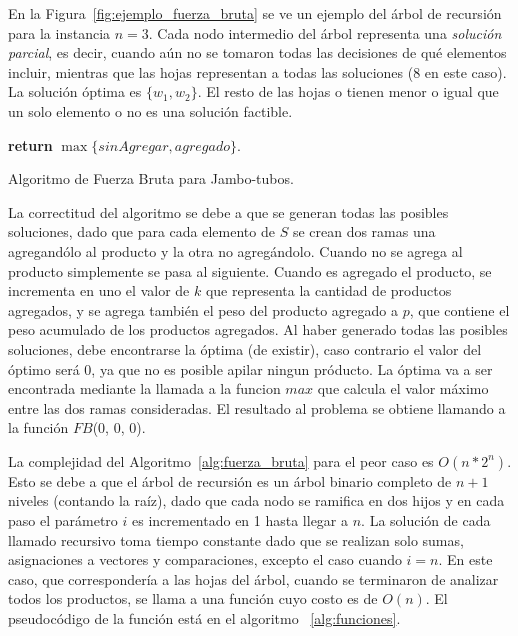 \documentclass[10pt,a4paper]{article}
\begin{document}
En la Figura~\ref{fig:ejemplo_fuerza_bruta} se ve un ejemplo del árbol de recursión para la instancia $n=3$. Cada nodo intermedio del árbol representa una \emph{solución parcial}, es decir, cuando aún no se tomaron todas las decisiones de qué elementos incluir, mientras que las hojas representan a todas las soluciones (8 en este caso). La solución óptima es $\{w_1, w_2\}$. El resto de las hojas o tienen menor o igual que un solo elemento o no es una soluci\'on factible.

\begin{algorithm}
\begin{algorithmic}[1]
    \EndIf
    \State \textbf{return} $\max \{ sinAgregar,agregado \}$.
\EndFunction
\end{algorithmic}
\caption{Algoritmo de Fuerza Bruta para Jambo-tubos.}
\label{alg:fuerza_bruta}
\end{algorithm}

La correctitud del algoritmo se debe a que se generan todas las posibles soluciones, dado que para cada elemento de $S$ se crean dos ramas una agregandólo al producto y la otra no agregándolo. Cuando no se agrega al producto simplemente se pasa al siguiente. Cuando es agregado el producto, se incrementa en uno el valor de $k$ que representa la cantidad de productos agregados, y se agrega también el peso del producto agregado a $p$, que contiene el peso acumulado de los productos agregados. Al haber generado todas las posibles soluciones, debe encontrarse la óptima (de existir), caso contrario el valor del óptimo será $0$, ya que no es posible apilar ningun próducto. La óptima va a ser encontrada mediante la llamada a la funcion $max$ que calcula el valor máximo entre las dos ramas consideradas. El resultado al problema se obtiene llamando a la función $FB$($0$, $0$, $0$).

La complejidad del Algoritmo~\ref{alg:fuerza_bruta} para el peor caso es $O(n*2^n)$. Esto se debe a que el árbol de recursión es un árbol binario completo de $n+1$ niveles (contando la raíz), dado que cada nodo se ramifica en dos hijos y en cada paso el parámetro $i$ es incrementado en 1 hasta llegar a $n$. La solución de cada llamado recursivo toma tiempo constante dado que se realizan solo sumas, asignaciones a vectores y comparaciones, excepto el caso cuando $i = n$. En este caso, que correspondería a las hojas del árbol, cuando se terminaron de analizar todos los productos, se llama a una función cuyo costo es de $O(n)$. El pseudocódigo de la función está en el algoritmo ~\ref{alg:funciones}.
\end{document}

